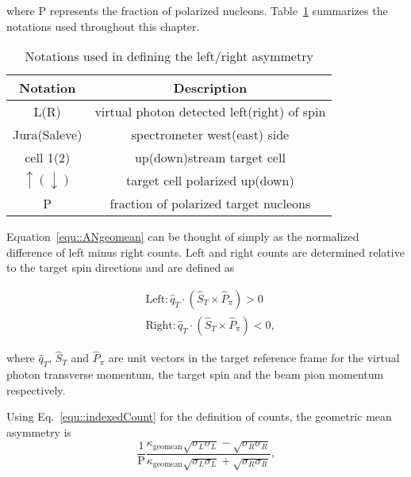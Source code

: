 \noindent
where P represents the fraction of polarized
nucleons. Table~\ref{tab::ANnotations} summarizes the notations used throughout
this chapter.

\begin{table}[h!t]
  \centering
  \label{tab::ANnotations}
  \caption{Notations used in defining the left/right asymmetry}
  \begin{tabular}{ |c|c| }
    \hline
    \textbf{Notation}& \textbf{Description} \\
    \hline

    L(R) & virtual photon detected left(right) of spin \\ \hline
    Jura(Saleve) & spectrometer west(east) side \\ \hline
    cell 1(2)& up(down)stream target cell \\ \hline
    $\uparrow(\downarrow)$ & target cell polarized up(down) \\ \hline
    P& fraction of polarized target nucleons \\ \hline
    
  \end{tabular}
\end{table}

Equation~\ref{equ::ANgeomean} can be thought of simply as the normalized
difference of left minus right counts.  Left and right counts are determined
relative to the target spin directions and are defined as

\begin{equation}
  \label{equ::Defleftright}
  \begin{aligned}
    &\text{Left}: \hat{q}_T \cdot (\hat{S}_T \times \hat{P}_{\pi}) > 0 \\
    &\text{Right}: \hat{q}_T \cdot (\hat{S}_T \times \hat{P}_{\pi}) < 0, 
  \end{aligned}
\end{equation}

\noindent
where $\hat{q}_T$, $\hat{S}_T$ and $\hat{P}_{\pi}$ are unit vectors in the
target reference frame for the virtual photon transverse momentum, the target
spin and the beam pion momentum respectively.

Using Eq.~\ref{equ::indexedCount} for the definition of counts, the geometric
mean asymmetry is
\begin{equation}
  \label{equ::ANgeomean_expand}
  \frac{1}{\mathrm{P}}\frac{\kappa_{\mathrm{geomean}}
    \sqrt{\sigma_{L}\sigma_{L}} -
    \sqrt{\sigma_{R}\sigma_{R}}}{\kappa_{\mathrm{geomean}}
    \sqrt{\sigma_{L}\sigma_{L}} + \sqrt{\sigma_{R}\sigma_{R}}},
\end{equation}

